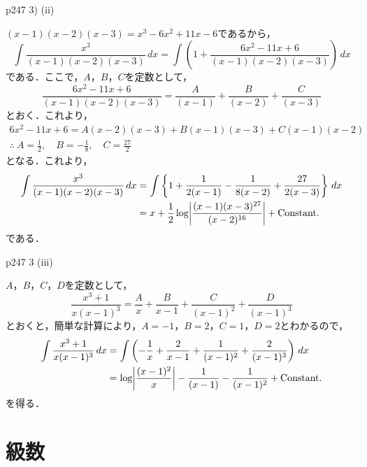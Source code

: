 \documentclass[dvipdfmx,uplatex,11pt]{jsarticle}
\DeclarePairedDelimiter\abs{\lvert}{\rvert}
\theoremstyle{definition}
\begin{document}
p247 3) (ii)
\begin{leftbar}
    $(x-1)(x-2)(x-3)=x^3 -6x^2+11x-6$であるから，
    \[
        \int \frac{x^3}{(x-1)(x-2)(x-3)} \, dx  = \int \left (1+ \frac{6x^2-11x+6}{(x-1)(x-2)(x-3)}\right) \, dx
    \]
    である．ここで，$A$，$B$，$C$を定数として，
    \[
        \frac{6x^2-11x+6}{(x-1)(x-2)(x-3)} = \frac{A}{(x-1)}+\frac{B}{(x-2)}+\frac{C}{(x-3)}
    \]
    とおく．これより，
    \begin{gather*}
        6x^2-11x+6 = A(x-2)(x-3)+B (x-1)(x-3)+C(x-1)(x-2) \\
        \therefore ~ A = \frac{1}{2}, \quad B = -\frac{1}{8},\quad C= \frac{27}{2}
    \end{gather*}
    となる．これより，
    \begin{align*}
        \int \frac{x^3}{(x-1)(x-2)(x-3)} \, dx & = \int \left \{ 1+ \frac{1}{2(x-1)} - \frac{1}{8(x-2)}+\frac{27}{2(x-3)} \right \} \, dx  \\
        & = x + \frac{1}{2} \log \abs*{\frac{(x-1)(x-3)^{27}}{(x-2)^{16}}}+\mathrm{Constant.}
    \end{align*}
    である．
\end{leftbar}

p247 3 (iii)
\begin{leftbar}
    $A$，$B$，$C$，$D$を定数として，
    \[
        \frac{x^3+1}{x(x-1)^3} = \frac{A}{x}+\frac{B}{x-1}+\frac{C}{(x-1)^2}+\frac{D}{(x-1)^3}
    \]
    とおくと，簡単な計算により，$A=-1$，$B=2$，$C=1$，$D=2$とわかるので，
    \begin{align*}
        \int \frac{x^3+1}{x(x-1)^3} \, dx & = \int \left (-\frac{1}{x}+\frac{2}{x-1}+\frac{1}{(x-1)^2}+\frac{2}{(x-1)^3} \right ) \, dx \\
        & = \log \abs*{\frac{(x-1)^2}{x}} -\frac{1}{(x-1)}-\frac{1}{(x-1)^2}+ \mathrm{Constant.}
    \end{align*}
    を得る．
\end{leftbar}

\newpage 

\section{級数}
\end{document}
